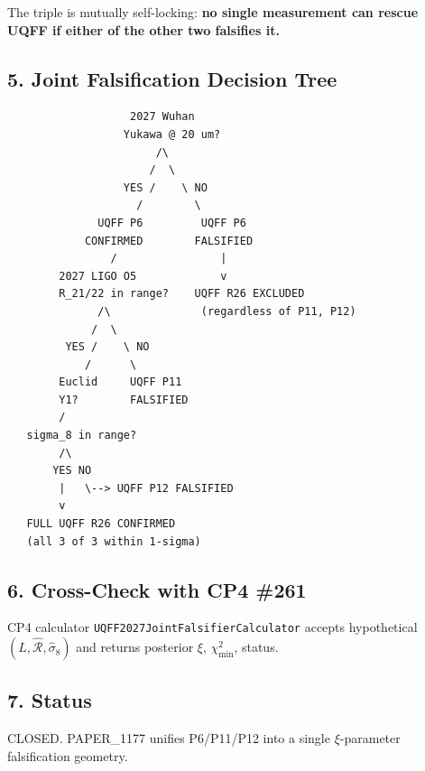 \documentclass[
]{article}
\begin{document}
The triple is mutually self-locking: \textbf{no single measurement can
rescue UQFF if either of the other two falsifies it.}

\subsection{5. Joint Falsification Decision
Tree}\label{joint-falsification-decision-tree}

\begin{verbatim}
                   2027 Wuhan
                  Yukawa @ 20 um?
                       /\
                      /  \
                  YES /    \ NO
                    /        \
              UQFF P6         UQFF P6
            CONFIRMED        FALSIFIED
                /                |
        2027 LIGO O5             v
        R_21/22 in range?    UQFF R26 EXCLUDED
              /\              (regardless of P11, P12)
             /  \
         YES /    \ NO
            /      \
        Euclid     UQFF P11
        Y1?        FALSIFIED
        /
   sigma_8 in range?
        /\
       YES NO
        |   \--> UQFF P12 FALSIFIED
        v
   FULL UQFF R26 CONFIRMED
   (all 3 of 3 within 1-sigma)
\end{verbatim}

\subsection{6. Cross-Check with CP4
\#261}\label{cross-check-with-cp4-261}

CP4 calculator \texttt{UQFF2027JointFalsifierCalculator} accepts
hypothetical \((\hat L, \hat{\mathcal R}, \hat\sigma_8)\) and returns
posterior \(\xi\), \(\chi^2_{\min}\), status.

\subsection{7. Status}\label{status}

CLOSED. PAPER\_1177 unifies P6/P11/P12 into a single \(\xi\)-parameter
falsification geometry.




\end{document}
